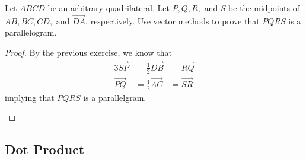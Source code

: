 \begin{exercise} \label{e1.1.5}
    Let \( ABCD \) be an arbitrary quadrilateral. Let \( P,Q,R,\text{ and } S \) be the midpoints of \( \overline{AB},\overline{BC},\overline{CD},\text{ and } \overrightarrow{DA} \), respectively. Use vector methods to prove that \( PQRS \) is a parallelogram.
    
    \begin{proof}
        By the previous exercise, we know that
        \begin{alignat*}{3}
            \overrightarrow{SP} &= \frac{1}{2}\overrightarrow{DB} &= \overrightarrow{RQ}  \\
            \overrightarrow{PQ} &= \frac{1}{2}\overrightarrow{AC} &= \overrightarrow{SR} 
        \end{alignat*}
        implying that \( PQRS \) is a parallelgram.
        
        \begin{center}
        \end{center}
    \end{proof}
\end{exercise}


\subsection{Dot Product}

